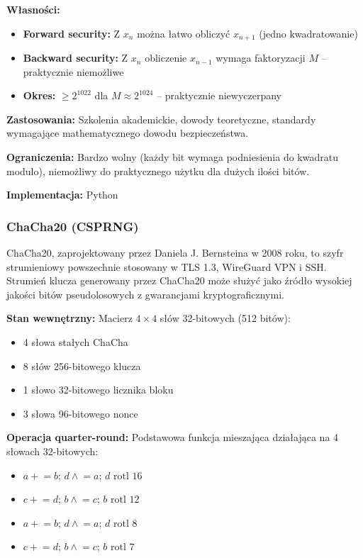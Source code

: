 \documentclass[12pt,a4paper]{article}
\begin{document}
\textbf{Własności:}
\begin{itemize}
    \item \textbf{Forward security:} Z $x_n$ można łatwo obliczyć $x_{n+1}$ (jedno kwadratowanie)
    \item \textbf{Backward security:} Z $x_n$ obliczenie $x_{n-1}$ wymaga faktoryzacji $M$ – praktycznie niemożliwe
    \item \textbf{Okres:} $\geq 2^{1022}$ dla $M \approx 2^{1024}$ – praktycznie niewyczerpany
\end{itemize}

\textbf{Zastosowania:} Szkolenia akademickie, dowody teoretyczne, standardy wymagające mathematycznego dowodu bezpieczeństwa.

\textbf{Ograniczenia:} Bardzo wolny (każdy bit wymaga podniesienia do kwadratu modulo), niemożliwy do praktycznego użytku dla dużych ilości bitów.

\textbf{Implementacja:} Python

\subsubsection{ChaCha20 (CSPRNG)}

ChaCha20, zaprojektowany przez Daniela J. Bernsteina w 2008 roku, to szyfr strumieniowy powszechnie stosowany w TLS 1.3, WireGuard VPN i SSH. Strumień klucza generowany przez ChaCha20 może służyć jako źródło wysokiej jakości bitów pseudolosowych z gwarancjami kryptograficznymi.

\textbf{Stan wewnętrzny:} Macierz $4 \times 4$ słów 32-bitowych (512 bitów):
\begin{itemize}
    \item 4 słowa stałych ChaCha
    \item 8 słów 256-bitowego klucza
    \item 1 słowo 32-bitowego licznika bloku
    \item 3 słowa 96-bitowego nonce
\end{itemize}

\textbf{Operacja quarter-round:} Podstawowa funkcja mieszająca działająca na 4 słowach 32-bitowych:
\begin{itemize}
    \item $a \mathrel{+}= b$; $d \mathrel{\wedge}= a$; $d \text{ rotl } 16$
    \item $c \mathrel{+}= d$; $b \mathrel{\wedge}= c$; $b \text{ rotl } 12$
    \item $a \mathrel{+}= b$; $d \mathrel{\wedge}= a$; $d \text{ rotl } 8$
    \item $c \mathrel{+}= d$; $b \mathrel{\wedge}= c$; $b \text{ rotl } 7$
\end{itemize}
\end{document}
